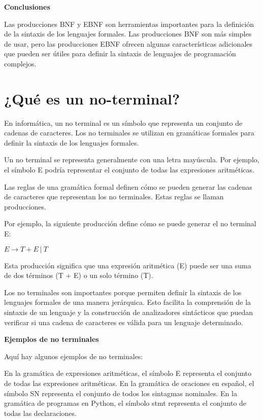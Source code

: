 \textbf{Conclusiones}

Las producciones BNF y EBNF son herramientas importantes para la definición de la sintaxis de los lenguajes formales. Las producciones BNF son más simples de usar, pero las producciones EBNF ofrecen algunas características adicionales que pueden ser útiles para definir la sintaxis de lenguajes de programación complejos.





\section{¿Qué es un no\hyp{}terminal?}

En informática, un no terminal es un símbolo que representa un conjunto de cadenas de caracteres. Los no terminales se utilizan en gramáticas formales para definir la sintaxis de los lenguajes formales.

Un no terminal se representa generalmente con una letra mayúscula. Por ejemplo, el símbolo E podría representar el conjunto de todas las expresiones aritméticas.

Las reglas de una gramática formal definen cómo se pueden generar las cadenas de caracteres que representan los no terminales. Estas reglas se llaman producciones.

Por ejemplo, la siguiente producción define cómo se puede generar el no terminal E:

$E \xrightarrow{} T + E\: |\: T$

Esta producción significa que una expresión aritmética (E) puede ser una suma de dos términos (T + E) o un solo término (T).

Los no terminales son importantes porque permiten definir la sintaxis de los lenguajes formales de una manera jerárquica. Esto facilita la comprensión de la sintaxis de un lenguaje y la construcción de analizadores sintácticos que puedan verificar si una cadena de caracteres es válida para un lenguaje determinado.

\textbf{Ejemplos de no terminales}

Aquí hay algunos ejemplos de no terminales:

    En la gramática de expresiones aritméticas, el símbolo E representa el conjunto de todas las expresiones aritméticas.
    En la gramática de oraciones en español, el símbolo SN representa el conjunto de todos los sintagmas nominales.
    En la gramática de programas en Python, el símbolo stmt representa el conjunto de todas las declaraciones.

